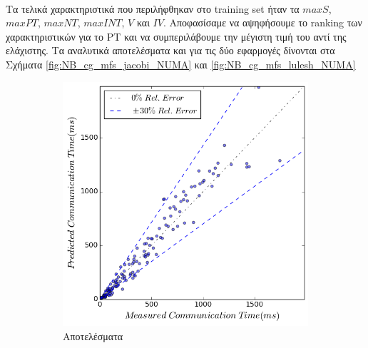 \paragraph{}
Τα τελικά χαρακτηριστικά που περιλήφθηκαν στο training set ήταν τα $maxS$, $maxPT$, $maxNT$, $maxINT$, $V$ και $IV$. Αποφασίσαμε να αψηφήσουμε το ranking των χαρακτηριστικών για το PT και να συμπεριλάβουμε την μέγιστη τιμή του αντί της ελάχιστης. Τα αναλυτικά αποτελέσματα και για τις δύο εφαρμογές δίνονται στα Σχήματα \ref{fig:NB_cg_mfs_jacobi_NUMA} και \ref{fig:NB_cg_mfs_lulesh_NUMA}
\begin{figure}[ht]
    \centering
    \captionsetup{justification=centering,margin=0cm,font=footnotesize}
    \begin{subfigure}[b]{0.47\textwidth}
        \includegraphics[width=\textwidth]{./images/NB+cg_mfs_NUMA/jacobi_res.png}
        \caption{Αποτελέσματα}
    \end{subfigure}
    \quad %
    \begin{subfigure}[b]{0.47\textwidth}

\end{subfigure}
\end{figure}
